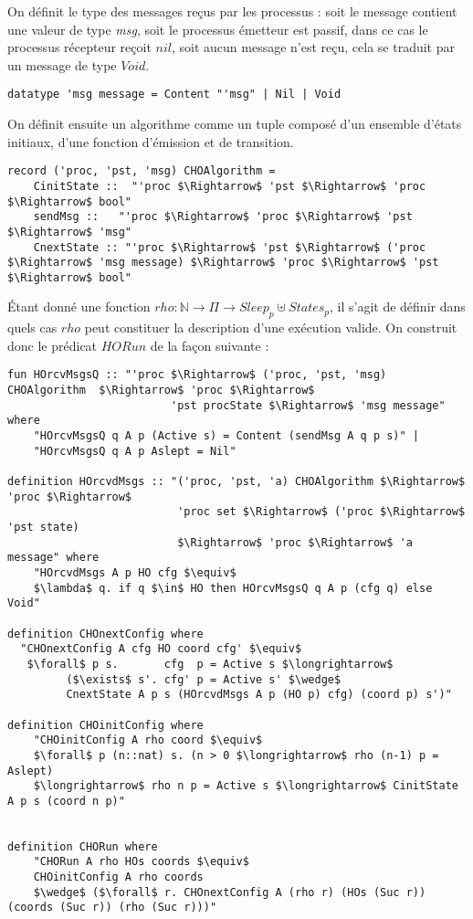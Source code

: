 \documentclass{article}
\begin{document}
On définit le type des messages reçus par les processus : soit le message contient une valeur de type \textit{msg}, soit le processus émetteur est passif,
dans ce cas le processus récepteur reçoit $nil$, soit aucun message n'est reçu, cela se traduit par un message de type $Void$.

\begin{lstlisting}
datatype 'msg message = Content "'msg" | Nil | Void
\end{lstlisting}

On définit ensuite un algorithme comme un tuple composé d'un ensemble d'états initiaux, d'une fonction d'émission et de transition.

\begin{lstlisting}[mathescape=true]
record ('proc, 'pst, 'msg) CHOAlgorithm =
	CinitState ::  "'proc $\Rightarrow$ 'pst $\Rightarrow$ 'proc $\Rightarrow$ bool"
	sendMsg ::   "'proc $\Rightarrow$ 'proc $\Rightarrow$ 'pst $\Rightarrow$ 'msg"
	CnextState :: "'proc $\Rightarrow$ 'pst $\Rightarrow$ ('proc $\Rightarrow$ 'msg message) $\Rightarrow$ 'proc $\Rightarrow$ 'pst $\Rightarrow$ bool"
\end{lstlisting}

Étant donné une fonction $rho : \mathds{N} \rightarrow \Pi \rightarrow Sleep_p \uplus States_p$, il s'agit de définir dans quels cas $rho$ peut constituer la description d'une exécution valide.
On construit donc le prédicat $HORun$ de la façon suivante :

\begin{lstlisting}[mathescape=true]
fun HOrcvMsgsQ :: "'proc $\Rightarrow$ ('proc, 'pst, 'msg) CHOAlgorithm  $\Rightarrow$ 'proc $\Rightarrow$
                         'pst procState $\Rightarrow$ 'msg message" where
	"HOrcvMsgsQ q A p (Active s) = Content (sendMsg A q p s)" |
	"HOrcvMsgsQ q A p Aslept = Nil"

definition HOrcvdMsgs :: "('proc, 'pst, 'a) CHOAlgorithm $\Rightarrow$ 'proc $\Rightarrow$
                          'proc set $\Rightarrow$ ('proc $\Rightarrow$ 'pst state)
                          $\Rightarrow$ 'proc $\Rightarrow$ 'a message" where
	"HOrcvdMsgs A p HO cfg $\equiv$
	$\lambda$ q. if q $\in$ HO then HOrcvMsgsQ q A p (cfg q) else Void"

definition CHOnextConfig where
  "CHOnextConfig A cfg HO coord cfg' $\equiv$
   $\forall$ p s.       cfg  p = Active s $\longrightarrow$
         ($\exists$ s'. cfg' p = Active s' $\wedge$
		 CnextState A p s (HOrcvdMsgs A p (HO p) cfg) (coord p) s')"

definition CHOinitConfig where
	"CHOinitConfig A rho coord $\equiv$
	$\forall$ p (n::nat) s. (n > 0 $\longrightarrow$ rho (n-1) p = Aslept)
	$\longrightarrow$ rho n p = Active s $\longrightarrow$ CinitState A p s (coord n p)"


definition CHORun where
	"CHORun A rho HOs coords $\equiv$
	CHOinitConfig A rho coords
	$\wedge$ ($\forall$ r. CHOnextConfig A (rho r) (HOs (Suc r)) (coords (Suc r)) (rho (Suc r)))"
\end{lstlisting}
\end{document}
